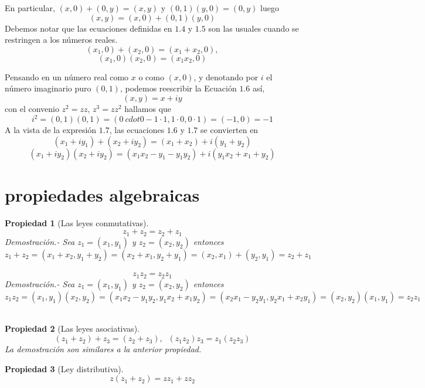 \documentclass[10pt]{book}
\newtheorem{prop}{\large\textbf{Propiedad}}[part]
\begin{document}
En particular, $(x,0) + (0,y) = (x,y)$ y $(0,1)(y,0) = (0,y)$ luego 
\begin{equation}
(x,y) = (x,0) + (0,1)(y,0)
\end{equation}
Debemos notar que las ecuaciones definidas en $1.4$ y $1.5$ son las usuales cuando se restringen a los números reales.
$$(x_1,0)+(x_2,0) = (x_1+x_2,0),$$
$$(x_1,0)(x_2,0) = (x_1 x_2,0)$$  

Pensando en un número real como $x$ o como $(x,0)$, y denotando por $i$ el número imaginario puro $(0,1)$, podemos reescribir la Ecuación $1.6$ así,
\begin{equation}
(x,y)=x+iy
\end{equation}
con el convenio $z^2=zz$, $z^3=zz^2$ hallamos que $$i^2 = (0,1)(0,1) = (0\ cdot 0 - 1\cdot 1,1\cdot 0, 0 \cdot 1) =(-1,0)= -1$$
A la vista de la expresión $1.7$, las ecuaciones $1.6$ y $1.7$ se convierten en
\begin{equation}
(x_1+iy_1)+(x_2+iy_2) = (x_1+x_2)+i(y_1+y_2)
\end{equation}
\begin{equation}
(x_1+iy_2)(x_2+iy_2)=(x_1 x_2 - y_1 - y_1 y_2)+i(y_1 x_2 + x_1 +y_2)
\end{equation}

\section{propiedades algebraicas}
\begin{tcolorbox}[colback = white]
\begin{prop}[Las leyes conmutativas]
$$z_1 + z_2 = z_2 + z_1 $$  
Demostración.- \; Sea $z_1=(x_1,y_1)$ y $z_2=(x_2,y_2)$ entonces $$z_1 + z_2 = (x_1+x_2,y_1+y_2) = (x_2+x_1,y_2+y_1) = (x_2,x_1)+(y_2,y_1) = z_2+z_1$$\\
$$ z_1 z_2=z_2 z_1$$
Demostración.- \; Sea $z_1=(x_1,y_1)$ y $z_2=(x_2,y_2)$ entonces
$$z_1 z_2 = (x_1,y_1)(x_2,y_2) = (x_1x_2 - y_1y_2,y_1x_2 + x_1y_2) = (x_2x_1 - y_2y_1,y_2x_1 + x_2y_1) = (x_2,y_2)(x_1,y_1) = z_2 z_1$$\\
\end{prop}
\begin{prop}[Las leyes asociativas]
$$(z_1+z_2)+z_3 = (z_2 + z_3), \; \; (z_1 z_2)z_3 = z_1(z_2 z_3)$$
La demostración son similares a la anterior propiedad.
\end{prop}
\begin{prop}[Ley distributiva]
$$z(z_1+z_2) = zz_1 + zz_2$$
\end{prop}
\end{tcolorbox}
\end{document}
